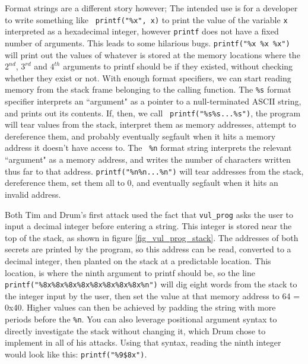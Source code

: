 Format strings are a different story however; The intended use is for a developer to write something like {\tt
printf("\%x", x)} to print the value of the variable {\tt x} interpreted as a hexadecimal integer, however {\tt printf}
does not have a fixed number of arguments. This leads to some hilarious bugs. {\tt printf("\%x \%x \%x")} will print out
the values of whatever is stored at the memory locations where the $2^{nd}$, $3^{rd}$ and $4^{th}$ arguments to printf
should be if they existed, without checking whether they exist or not. With enough format specifiers, we can start
reading memory from the stack frame belonging to the calling function. The {\tt \%s} format specifier interprets an
``argument" as a pointer to a null-terminated ASCII string, and prints out its contents. If, then, we call {\tt
printf("\%s\%s...\%s")}, the program will tear values from the stack, interpret them as memory addresses, attempt to
dereference them, and probably eventually segfault when it hits a memory address it doesn't have access to. The {\tt
\%n} format string interprets the relevant ``argument" as a memory address, and writes the number of characters written
thus far to that address. {\tt printf("\%n\%n...\%n")} will tear addresses from the stack, dereference them, set them
all to 0, and eventually segfault when it hits an invalid address.

Both Tim and Drum's first attack used the fact that {\tt vul\_prog} asks the user to input a decimal integer before
entering a string. This integer is stored near the top of the stack, as shown in figure \ref{fig_vul_prog_stack}. The
addresses of both secrets are printed by the program, so this address can be read, converted to a decimal integer, then
planted on the stack at a predictable location. This location, is where the ninth argument to printf should be, so the
line {\tt printf("\%8x\%8x\%8x\%8x\%8x\%8x\%8x\%8x\%n")} will dig eight words from the stack to the integer input by the
user, then set the value at that memory address to 64 = 0x40. Higher values can then be achieved by padding the string
with more periods before the {\tt \%n}. You can also leverage positional argument syntax to directly investigate the
stack without changing it, which Drum chose to implement in all of his attacks. Using that syntax, reading the ninth
integer would look like this: {\tt printf("\%9\$8x")}.

